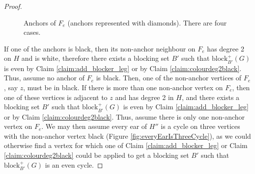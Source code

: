 \documentclass{patmorin}
\newcommand{\block}{\mathrm{block}}
\begin{document}
\begin{proof}
\begin{figure}[!ht]
  \hspace{25px}
  \caption{Anchors of $F_e$ (anchors represented with diamonds). There are four cases.}
  \label{fig:faceAnchorsHprimeprime}
  
\end{figure}

If one of the anchors is black, then its non-anchor neighbour on $F_e$ has degree 2 on $H$ and is white, therefore there exists a blocking set $B'$ such that $\block_{B'}^+(G)$ is even by Claim \ref{claim:add_blocker_leg} or by Claim \ref{claim:colourdeg2black}. Thus, assume no anchor of $F_e$ is black. Then, one of the non-anchor vertices of $F_e$, say $z$, must be in black. If there is more than one non-anchor vertex on $F_e$, then one of these vertices is adjacent to $z$ and has degree 2 in $H$, and there exists a blocking set $B'$ such that $\block_{B'}^+(G)$ is even by Claim \ref{claim:add_blocker_leg} or by Claim \ref{claim:colourdeg2black}. Thus, assume there is only one non-anchor vertex on $F_e$. We may then assume every ear of $H''$ is a cycle on three vertices with the non-anchor vertex black (Figure \ref{fig:everyEarIsThreeCycle}), as we could otherwise find a vertex for which one of Claim \ref{claim:add_blocker_leg} or Claim \ref{claim:colourdeg2black} could be applied to get a blocking set $B'$ such that $\block_{B'}^+(G)$ is an even cycle.


\end{proof}
\end{document}
